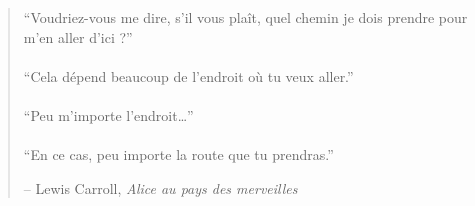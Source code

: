 
\newpage \vspace*{4cm}
\thispagestyle{empty}
\begin{quotation}
\begin{center}
  \large
  \enquote{Voudriez-vous me dire, s’il vous plaît, quel chemin je dois prendre
  pour m’en aller d’ici ?} \\~\\
  \enquote{Cela dépend beaucoup de l’endroit où tu veux aller.} \\~\\
  \enquote{Peu m’importe l’endroit…} \\~\\
  \enquote{En ce cas, peu importe la route que tu prendras.}
\end{center}
\begin{flushright} -- Lewis Carroll, \textit{Alice au pays des merveilles}\end{flushright}
\end{quotation}
